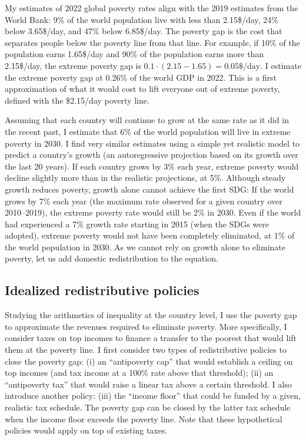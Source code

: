 

My estimates of 2022 global poverty rates align with the 2019 estimates from the World Bank: 9\% of the world population live with less than 2.15\$/day, 24\% below 3.65\$/day, and 47\% below 6.85\$/day. 
The poverty gap is the cost that separates people below the poverty line from that line. For example, if 10\% of the population earns 1.65\$/day and 90\% of the population earns more than 2.15\$/day, the extreme poverty gap is $0.1 \cdot (2.15 - 1.65) = 0.05\$/\text{day}$. %
I estimate the extreme poverty gap at 0.26\% of the world GDP in 2022. This is a first approximation of what it would cost to lift everyone out of extreme poverty, defined with the \$2.15/day poverty line. 

Assuming that each country will continue to grow at the same rate as it did in the recent past, %
I estimate that 6\% of the world population will live in extreme poverty in 2030. I find very similar estimates using a simple yet realistic model to predict a country's growth (an autoregressive projection based on its growth over the last 20 years). 
If each country grows by 3\% each year, extreme poverty would decline slightly more than in the realistic projections, at 5\%. 
Although steady growth reduces poverty, growth alone cannot achieve the first SDG: If the world grows by 7\% each year (the maximum rate observed for a given country over 2010--2019), %
the extreme poverty rate would still be 2\% in 2030. Even if the world had experienced a 7\% growth rate starting in 2015 (when the SDGs were adopted), extreme poverty would not have been completely eliminated, at 1\% of the world population in 2030. 
As we cannot rely on growth alone to eliminate poverty, let us add domestic redistribution to the equation. 

\subsection{Idealized redistributive policies}

Studying the arithmetics of inequality at the country level, I use the poverty gap to approximate the revenues required to eliminate poverty. 
More specifically, I consider taxes on top incomes to finance a transfer to the poorest that would lift them at the poverty line. I first consider two types of redistributive policies to close the poverty gap: (i) an ``antipoverty cap'' that would establish a ceiling on top incomes (and tax income at a 100\% rate above that threshold); (ii) an ``antipoverty tax'' that would raise a linear tax above a certain threshold. I also introduce another policy: (iii) the ``income floor'' that could be funded by a given, realistic tax schedule. The poverty gap can be closed by the latter tax schedule when the income floor exceeds the poverty line. Note that these hypothetical policies would apply on top of existing taxes. 

